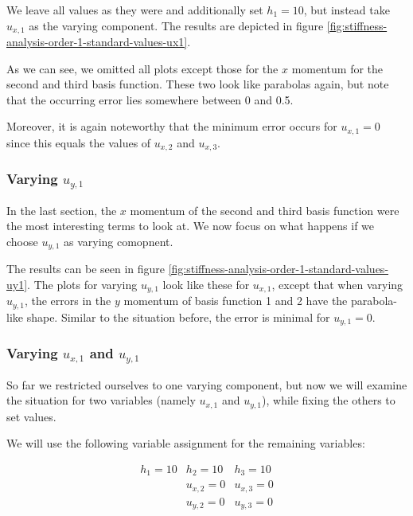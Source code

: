 \documentclass{article}
\begin{document}
We leave all values as they were and additionally set $h_1=10$, but instead take $u_{x,1}$ as the varying component. The results are depicted in figure \ref{fig:stiffness-analysis-order-1-standard-values-ux1}.



As we can see, we omitted all plots except those for the $x$ momentum for the second and third basis function. These two look like parabolas again, but note that the occurring error lies somewhere between 0 and 0.5.

Moreover, it is again noteworthy that the minimum error occurs for $u_{x,1}=0$ since this equals the values of $u_{x,2}$ and $u_{x,3}$.

\subsubsection{\texorpdfstring{Varying $u_{y,1}$}{Varying uy1}}

In the last section, the $x$ momentum of the second and third basis function were the most interesting terms to look at. We now focus on what happens if we choose $u_{y,1}$ as varying comopnent.



The results can be seen in figure \ref{fig:stiffness-analysis-order-1-standard-values-uy1}. The plots for varying $u_{y,1}$ look like these for $u_{x,1}$, except that when varying $u_{y,1}$, the errors in the $y$ momentum of basis function 1 and 2 have the parabola-like shape. Similar to the situation before, the error is minimal for $u_{y,1}=0$.

\subsubsection{\texorpdfstring{Varying $u_{x,1}$ and $u_{y,1}$}{Varying ux1 and uy1}}

So far we restricted ourselves to one varying component, but now we will examine the situation for two variables (namely $u_{x,1}$ and $u_{y,1}$), while fixing the others to set values.

We will use the following variable assignment for the remaining variables:

\begin{eqnarray*}
  h_1 = 10 & h_2 = 10 & h_3 = 10 \\
   & u_{x,2} = 0 & u_{x,3} = 0 \\
   & u_{y,2} = 0 & u_{y,3} = 0
\end{eqnarray*}
\end{document}
